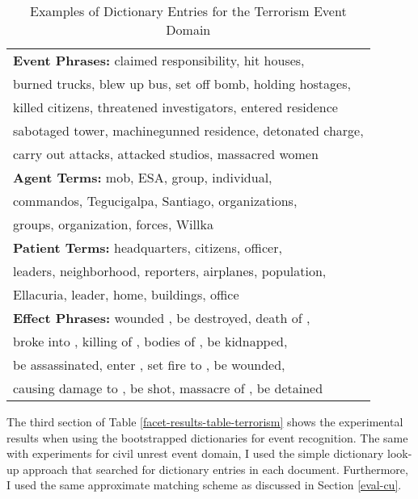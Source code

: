 \begin{table}[htbp]
\small
\centering
\begin{tabular}[center]{|l|} \hline
{\bf Event Phrases:} claimed responsibility, hit houses,\\
burned trucks, blew up bus, set off bomb, holding hostages,\\
killed citizens, threatened investigators, entered residence\\
sabotaged tower, machinegunned residence, detonated charge,\\  
carry out attacks, attacked studios, massacred women\\ 
\hline
 {\bf Agent Terms:} mob, ESA, group, individual,\\
commandos, Tegucigalpa, Santiago, organizations,\\
groups, organization, forces, Willka\\ 
\hline
 {\bf Patient Terms:} headquarters, citizens, officer,\\
leaders, neighborhood, reporters, airplanes, population,\\
Ellacuria, leader, home, buildings, office\\ 
\hline
{\bf Effect Phrases:} wounded {\it *}, {\it *} be destroyed, death of {\it *},\\
broke into {\it *}, killing of {\it *}, bodies of {\it *}, {\it *} be kidnapped,\\
{\it *} be assassinated, enter {\it *}, set fire to {\it *}, {\it *} be wounded,\\
causing damage to {\it *}, {\it *} be shot, massacre of {\it *}, {\it *} be detained\\
\hline

\end{tabular}
\caption{Examples of Dictionary Entries for the Terrorism Event Domain}
\label{sample-table-terrorism}
\end{table}

The third section of Table \ref{facet-results-table-terrorism} 
shows the experimental results when using the bootstrapped dictionaries 
for event recognition. 
The same with experiments for civil unrest event domain, 
I used the
simple dictionary look-up approach that searched for dictionary
entries in each document. 
Furthermore, I used the same approximate matching scheme as discussed 
in Section \ref{eval-cu}.

